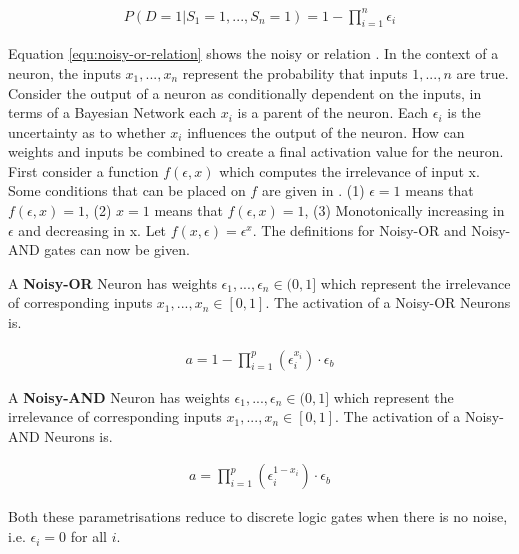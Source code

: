 \begin{align}
P(D = 1 | S_1 = 1, ..., S_n = 1) = 1 - \prod^n_{i=1} \epsilon_i
\label{equ:noisy-or-relation}
\end{align}

Equation \ref{equ:noisy-or-relation} shows the noisy or relation \cite{LearningLogicalActivations}. In the context of a neuron, the inputs $x_1, ..., x_n$ represent the probability that inputs $1, ..., n$ are true. Consider the output of a neuron as conditionally dependent on the inputs, in terms of a Bayesian Network each $x_i$ is a parent of the neuron. Each $\epsilon_i$ is the uncertainty as to whether $x_i$ influences the output of the neuron. How can weights and inputs be combined to create a final activation value for the neuron. First consider a function $f(\epsilon, x)$ which computes the irrelevance of input x. Some conditions that can be placed on $f$ are given in \cite{LearningLogicalActivations}. (1) $\epsilon = 1$ means that $f(\epsilon, x) = 1$, (2) $x = 1$ means that $f(\epsilon, x) = 1$, (3) Monotonically increasing in $\epsilon$ and decreasing in x. Let $f(x, \epsilon) = \epsilon^x$. The definitions for Noisy-OR and Noisy-AND gates can now be given.

\begin{definition}
A \textbf{Noisy-OR} Neuron has weights $\epsilon_1, ..., \epsilon_n \in (0,1]$ which represent the irrelevance of corresponding inputs $x_1, ..., x_n \in [0,1]$. The activation of a Noisy-OR Neurons is.

\begin{align}
a = 1 - \prod^p_{i=1} (\epsilon_i^{x_i}) \cdot \epsilon_b
\label{equ:noisy-or-activation-1}
\end{align}
\end{definition}

\begin{definition}
A \textbf{Noisy-AND} Neuron has weights $\epsilon_1, ..., \epsilon_n \in (0, 1]$ which represent the irrelevance of corresponding inputs $x_1, ..., x_n \in [0,1]$. The activation of a Noisy-AND Neurons is.

\begin{align}
a = \prod^p_{i=1} (\epsilon_i^{1 - x_i}) \cdot \epsilon_b
\label{equ:noisy-and-activation-1}
\end{align}
\end{definition}

Both these parametrisations reduce to discrete logic gates when there is no noise, i.e. $\epsilon_i = 0$ for all $i$.\\

